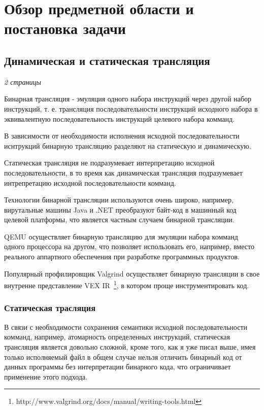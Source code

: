 \chapter{Обзор предметной области и постановка задачи}

\section{Динамическая и статическая трансляция}

\textit{2 страницы}

\begin{Def}\label{binary_translation}
Бинарная трансляция - эмуляция одного набора инструкций через другой набор инструкций, т. е. трансляция последовательности инструкций исходного набора в эквивалентную последовательность инструкций целевого набора комманд.
\end{Def}

В зависимости от необходимости исполнения исходной последовательности иснтрукций бинарную трансляцию разделяют на статическую и динамическую.

Статическая трансляция не подразумевает интерпретацию исходной последовательности, в то время как динамическая трансляция подразумевает интрепретацию исходной последовательности комманд.

Технологии бинарной трансляции используются очень широко, например, вирутальные машины Java и .NET преобразуют байт-код в машинный код целевой платформы, что является частным случаем бинарной трансляции.

QEMU осуществляет бинарную трансляцию для эмуляции набора комманд одного процессора на другом, что позволяет использовать его, например, вместо реального аппартного обеспечения при разработке программных продуктов.

Популярный профилировщик Valgrind осуществляет бинарную трансляции в свое внутренне представление VEX IR~\footnote{http://www.valgrind.org/docs/manual/writing-tools.html}, в котором проще инструментировать код.

\subsection{Статическая трасляция}

В связи с необходимости сохранения семантики исходной последовательности комманд, например, атомарность определенных инструкций, статическая трансляция является довольно сложной, кроме того, как я уже писал выше, имея только исполняемый файл в общем случае нельзя отличить бинарный код от данных программы без интерпретации бинарного кода, что ограничивает применение этого подхода.

